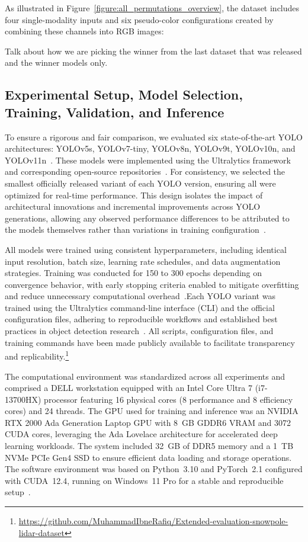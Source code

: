 \documentclass[runningheads]{llncs}
\begin{document}
As illustrated in Figure~\ref{figure:all_permutations_overview}, the dataset includes four single-modality inputs and six pseudo-color configurations created by combining these channels into RGB images:

Talk about how we are picking the winner from the last dataset that was released and the winner models only.

\subsection{Experimental Setup, Model Selection, Training, Validation, and Inference}

To ensure a rigorous and fair comparison, we evaluated six state-of-the-art YOLO architectures: YOLOv5s, YOLOv7-tiny, YOLOv8n, YOLOv9t, YOLOv10n, and YOLOv11n~\cite{ultralytics2025yolov5,wang2023yolov7,wang2024yolov9,jegham2023comprehensive}. These models were implemented using the Ultralytics framework and corresponding open-source repositories~\cite{ultralytics2025docs,ultralytics2024benchmark,ultralytics2024blog}. For consistency, we selected the smallest officially released variant of each YOLO version, ensuring all were optimized for real-time performance. This design isolates the impact of architectural innovations and incremental improvements across YOLO generations, allowing any observed performance differences to be attributed to the models themselves rather than variations in training configuration~\cite{ultralytics2024yolo11,jegham2025yolo}.

All models were trained using consistent hyperparameters, including identical input resolution, batch size, learning rate schedules, and data augmentation strategies. Training was conducted for 150 to 300 epochs depending on convergence behavior, with early stopping criteria enabled to mitigate overfitting and reduce unnecessary computational overhead~\cite{goodfellow2016deep}.Each YOLO variant was trained using the Ultralytics command-line interface (CLI) and the official configuration files, adhering to reproducible workflows and established best practices in object detection research~\cite{redmon2016you}. All scripts, configuration files, and training commands have been made publicly available to facilitate transparency and replicability.\footnote{\url{https://github.com/MuhammadIbneRafiq/Extended-evaluation-snowpole-lidar-dataset}}

The computational environment was standardized across all experiments and comprised a DELL workstation equipped with an Intel Core Ultra 7 (i7-13700HX) processor featuring 16 physical cores (8 performance and 8 efficiency cores) and 24 threads. The GPU used for training and inference was an NVIDIA RTX 2000 Ada Generation Laptop GPU with 8~GB GDDR6 VRAM and 3072 CUDA cores, leveraging the Ada Lovelace architecture for accelerated deep learning workloads. The system included 32~GB of DDR5 memory and a 1~TB NVMe PCIe Gen4 SSD to ensure efficient data loading and storage operations. The software environment was based on Python~3.10 and PyTorch~2.1 configured with CUDA~12.4, running on Windows~11 Pro for a stable and reproducible setup~\cite{jegham2023comprehensive,ultralytics2024blog}.
\end{document}
